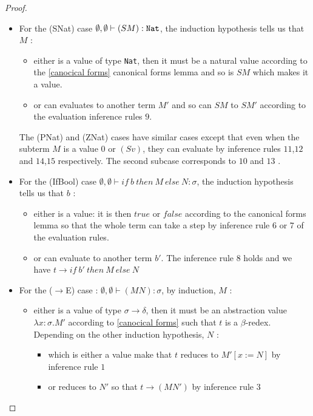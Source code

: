 \documentclass{article}
\begin{document}
\begin{proof}
\begin{itemize}
        \par
        \item For the (SNat) case $\emptyset,\emptyset\vdash(S M) : \verb|Nat|$, the induction hypothesis tells us that $M$ :
        \begin{itemize}
            \item either is a value of type \texttt{Nat}, then it must be a natural value according to the 
            \ref{canocical forms} canonical forms lemma and so is $S M$ which makes it a value.
            \item or can evaluates to another term $M'$ and so can $S M$ to $S M'$ according to the evaluation inference rules $9$.
        \end{itemize}
        The (PNat) and (ZNat) cases have similar cases except that even when the subterm $M$ is a value $0$ or $(S v)$, they can evaluate by inference rules $11$,$12$ and $14$,$15$ respectively. The second subcase corresponds to $10$ and $13$ .
        \item For the (IfBool) case $\emptyset,\emptyset\vdash if \ b \ then \ M \ else \ N : \sigma$, the induction hypothesis tells us that $b$ :
        \begin{itemize}
            \item either is a value: it is then $true$ or $false$ according to the canonical forms lemma so that the whole term can take a step by inference rule $6$ or $7$ of the evaluation rules.
            \item or can evaluate to another term $b'$. The inference rule $8$ holds and we have $t\rightarrow if \ b' \ then \ M \ else \ N$
        \end{itemize}
        \item For the ($\rightarrow$E) case : $\emptyset,\emptyset\vdash (M N):\sigma$, by induction, $M$ :
        \begin{itemize}
            \item either is a value of type $\sigma\rightarrow\delta$, then it must be an abstraction value $\lambda x : \sigma.M'$ according to 
            \ref{canocical forms} such that $t$ is a $\beta$-redex. Depending on the other induction hypothesis, $N$ :
            \begin{itemize}
                \item which is either a value make that $t$ reduces to $M'[x:=N]$ by inference rule $1$
                \item or reduces to $N'$ so that $t\rightarrow(M N')$ by inference rule $3$

\end{itemize}
\end{itemize}
\end{itemize}
\end{proof}
\end{document}

